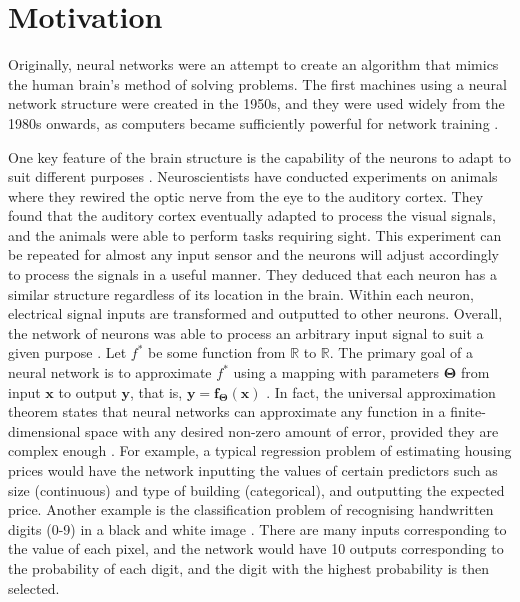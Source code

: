 \documentclass[honours,12pt]{unswthesis}
\newcommand{\R}{\mathbb{R}}
\numberwithin{equation}{section}
\theoremstyle{definition}
\begin{document}
\section{Motivation}\label{sec:2.1}
Originally, neural networks were an attempt to create an algorithm that mimics the human brain's method of solving problems. The first machines using a neural network structure were created in the 1950s, and they were used widely from the 1980s onwards, as computers became sufficiently powerful for network training \citep{DeepLearning}.

One key feature of the brain structure is the capability of the neurons to adapt to suit different purposes \citep{neuroplast}. Neuroscientists have conducted experiments on animals where they rewired the optic nerve from the eye to the auditory cortex. They found that the auditory cortex eventually adapted to process the visual signals, and the animals were able to perform tasks requiring sight. This experiment can be repeated for almost any input sensor and the neurons will adjust accordingly to process the signals in a useful manner. They deduced that each neuron has a similar structure regardless of its location in the brain. Within each neuron, electrical signal inputs are transformed and outputted to other neurons. Overall, the network of neurons was able to process an arbitrary input signal to suit a given purpose \citep{neuroplast}.
\newpage
Let $f^*$ be some function from $\R$ to $\R$. The primary goal of a neural network is to approximate $f^*$ using a mapping with parameters $\bm{\Theta}$ from input $\bm{x}$ to output $\bm{y}$, that is, $\bm{y}=\bm{f}_{\bm{\Theta}}(\bm{x})$ \citep{DeepLearning}. In fact, the universal approximation theorem states that neural networks can approximate any function in a finite-dimensional space with any desired non-zero amount of error, provided they are complex enough \citep{universal, cybenko}. For example, a typical regression problem of estimating housing prices would have the network inputting the values of certain predictors such as size (continuous) and type of building (categorical), and outputting the expected price. Another example is the classification problem of recognising handwritten digits (0-9) in a black and white image \citep{mnist}. There are many inputs corresponding to the value of each pixel, and the network would have 10 outputs corresponding to the probability of each digit, and the digit with the highest probability is then selected.
\end{document}
